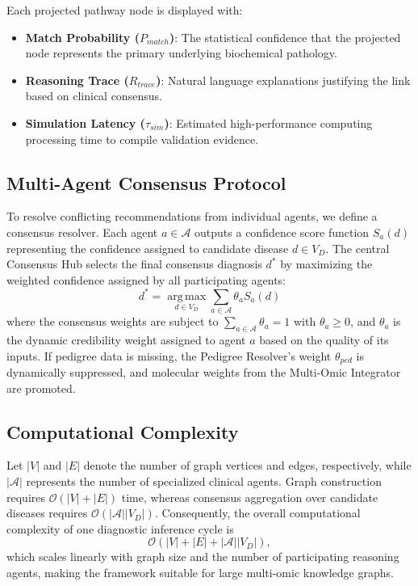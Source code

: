 \documentclass[conference]{IEEEtran}
\begin{document}
Each projected pathway node is displayed with:
\begin{itemize}
    \item \textbf{Match Probability ($P_{match}$)}: The statistical confidence that the projected node represents the primary underlying biochemical pathology.
    \item \textbf{Reasoning Trace ($R_{trace}$)}: Natural language explanations justifying the link based on clinical consensus.
    \item \textbf{Simulation Latency ($\tau_{sim}$)}: Estimated high-performance computing processing time to compile validation evidence.
\end{itemize}

\subsection{Multi-Agent Consensus Protocol}
To resolve conflicting recommendations from individual agents, we define a consensus resolver. Each agent $a \in \mathcal{A}$ outputs a confidence score function $S_a(d)$ representing the confidence assigned to candidate disease $d \in V_D$. The central Consensus Hub selects the final consensus diagnosis $d^*$ by maximizing the weighted confidence assigned by all participating agents:
\begin{equation}
d^*= \operatorname*{arg\,max}_{d\in V_D} \sum_{a\in\mathcal A} \theta_aS_a(d)
\end{equation}
where the consensus weights are subject to $\sum_{a \in \mathcal{A}} \theta_a = 1$ with $\theta_a \ge 0$, and $\theta_a$ is the dynamic credibility weight assigned to agent $a$ based on the quality of its inputs. If pedigree data is missing, the Pedigree Resolver's weight $\theta_{ped}$ is dynamically suppressed, and molecular weights from the Multi-Omic Integrator are promoted.

\subsection{Computational Complexity}
Let $|V|$ and $|E|$ denote the number of graph vertices and edges, respectively, while $|\mathcal{A}|$ represents the number of specialized clinical agents. Graph construction requires $\mathcal{O}(|V|+|E|)$ time, whereas consensus aggregation over candidate diseases requires $\mathcal{O}(|\mathcal{A}||V_D|)$. Consequently, the overall computational complexity of one diagnostic inference cycle is
\begin{equation}
\mathcal{O}\!\left(|V|+|E|+|\mathcal{A}||V_D|\right),
\end{equation}
which scales linearly with graph size and the number of participating reasoning agents, making the framework suitable for large multi-omic knowledge graphs.
\end{document}
